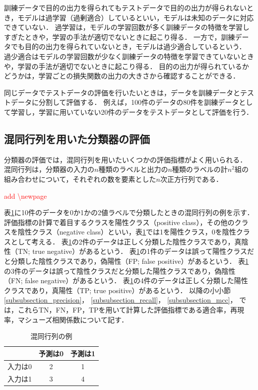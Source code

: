 \documentclass[12pt,a4j]{jreport}
\begin{document}
訓練データで目的の出力を得られてもテストデータで目的の出力が得られないとき，モデルは過学習（過剰適合）しているといい，モデルは未知のデータに対応できていない．
過学習は，モデルの学習回数が多く訓練データの特徴を学習しすぎたときや，学習の手法が適切でないときに起こり得る．
一方で，訓練データでも目的の出力を得られていないとき，モデルは過少適合しているという．
過少適合はモデルの学習回数が少なく訓練データの特徴を学習できていないときや，学習の手法が適切でないときに起こり得る．
目的の出力が得られているかどうかは，学習ごとの損失関数の出力の大きさから確認することができる．

同じデータでテストデータの評価を行いたいときは，データを訓練データとテストデータに分割して評価する．
例えば，100件のデータの80件を訓練データとして学習し，学習に用いていない20件のデータをテストデータとして評価を行う．


\subsection{混同行列を用いた分類器の評価}
分類器の評価では，混同行列を用いたいくつかの評価指標がよく用いられる\cite{aurellen20}．
混同行列は，分類器の入力の$n$種類のラベルと出力の$n$種類のラベルの計$n^2$組の組み合わせについて，それぞれの数を要素とした$n$次正方行列である．

\textcolor{red}{add \textbackslash newpage}
\newpage

表\ref{confusion_matrix}に10件のデータを0か1かの2値ラベルで分類したときの混同行列の例を示す．
評価指標の計算で着目するクラスを陽性クラス（positive class），その他のクラスを陰性クラス（negative class）といい，表\ref{confusion_matrix}では1を陽性クラス，0を陰性クラスとして考える．
表\ref{confusion_matrix}の2件のデータは正しく分類した陰性クラスであり，真陰性（TN; true negative）があるという．
表\ref{confusion_matrix}の1件のデータは誤って陽性クラスだと分類した陰性クラスであり，偽陽性（FP; false positive）があるという．
表\ref{confusion_matrix}の3件のデータは誤って陰性クラスだと分類した陽性クラスであり，偽陰性（FN; false negative）があるという．
表\ref{confusion_matrix}の4件のデータは正しく分類した陽性クラスであり，真陽性（TP; true positive）があるという．
以降の小小節
\ref{subsubsection_precision}，
\ref{subsubsection_recall}，
\ref{subsubsection_mcc}，
では，これらTN，FN，FP，TPを用いて計算した評価指標である適合率，再現率，マシューズ相関係数について記す．

\begin{table}[H]
  \caption{
    混同行列の例
    }
  \vspace{3mm}
  \centering
    \begin{tabular}{c|cc}
     & 予測は0 & 予測は1 \\
    \hline
    入力は0 & 2 & 1 \\
    入力は1 & 3 & 4
  \end{tabular}
  \label{confusion_matrix}
\end{table}
\end{document}
